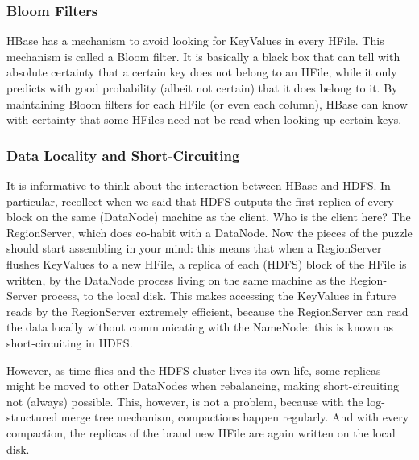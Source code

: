 \subsubsection{Bloom Filters}
HBase has a mechanism to avoid looking for KeyValues in every HFile. This mechanism is called a Bloom filter. It is basically a black box that can tell with absolute certainty that a certain key does not belong to an HFile, while it only predicts with good probability (albeit not certain) that it does belong to it. By maintaining Bloom filters for each HFile (or even each column), HBase can know with certainty that some HFiles need not be read when looking up certain keys.

\subsubsection{Data Locality and Short-Circuiting}
It is informative to think about the interaction between HBase and HDFS. In particular, recollect when we said that HDFS outputs the first replica of every block on the same (DataNode) machine as the client. Who is the client here? The RegionServer, which does co-habit with a DataNode. Now the pieces of the puzzle should start assembling in your mind: this means that when a RegionServer flushes KeyValues to a new HFile, a replica of each (HDFS) block of the HFile is written, by the DataNode process living on the same machine as the Region- Server process, to the local disk. This makes accessing the KeyValues in future reads by the RegionServer extremely efficient, because the RegionServer can read the data locally without communicating with the NameNode: this is known as short-circuiting in HDFS.

However, as time flies and the HDFS cluster lives its own life, some replicas might be moved to other DataNodes when rebalancing, making short-circuiting not (always) possible.
This, however, is not a problem, because with the log-structured merge tree mechanism, compactions happen regularly. And with every compaction, the replicas of the brand new HFile are again written on the local disk.

